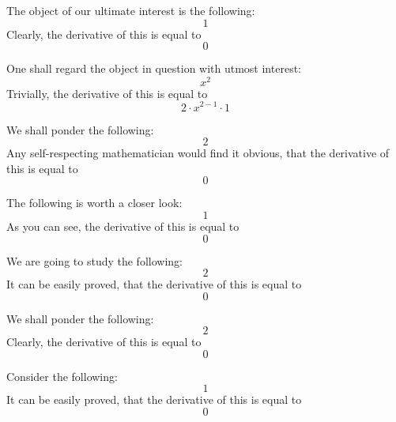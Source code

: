 \documentclass{article}
\begin{document}
The object of our ultimate interest is the following:
\begin{equation}
1 
\end{equation}
Clearly, the derivative of this is equal to
\begin{equation}
0 
\end{equation}

One shall regard the object in question with utmost interest:
\begin{equation}
x ^{2 } 
\end{equation}
Trivially, the derivative of this is equal to
\begin{equation}
2 \cdot x ^{2 - 1 } \cdot 1 
\end{equation}

We shall ponder the following:
\begin{equation}
2 
\end{equation}
Any self-respecting mathematician would find it obvious, that the derivative of this is equal to
\begin{equation}
0 
\end{equation}

The following is worth a closer look:
\begin{equation}
1 
\end{equation}
As you can see, the derivative of this is equal to
\begin{equation}
0 
\end{equation}

We are going to study the following:
\begin{equation}
2 
\end{equation}
It can be easily proved, that the derivative of this is equal to
\begin{equation}
0 
\end{equation}

We shall ponder the following:
\begin{equation}
2 
\end{equation}
Clearly, the derivative of this is equal to
\begin{equation}
0 
\end{equation}

Consider the following:
\begin{equation}
1 
\end{equation}
It can be easily proved, that the derivative of this is equal to
\begin{equation}
0 
\end{equation}
\end{document}
